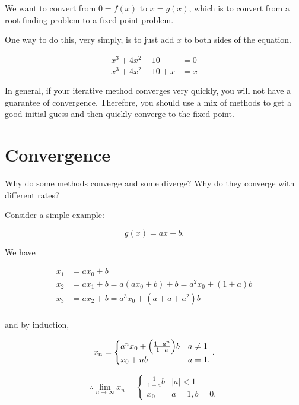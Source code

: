 We want to convert from $0 = f(x)$ to $x=g(x)$, which is to convert from a root
finding problem to a fixed point problem.

One way to do this, very simply, is to just add $x$ to both sides of the
equation.

\begin{align*}
  x^3 + 4x^2 -10 &= 0 \\
  x^3 + 4x^2 -10 + x &= x
\end{align*}

In general, if your iterative method converges very quickly, you will not have
a guarantee of convergence. Therefore, you should use a mix of methods to
get a good initial guess and then quickly converge to the fixed point.

\section{Convergence}

Why do some methods converge and some diverge? Why do they converge with
different rates?

Consider a simple example:

\ex

\[
g(x) = ax+b
.\]

We have

\begin{align*}
  x_1 &=  ax_0 + b \\
  x_2 &=  ax_1 + b = a(ax_0 + b) + b = a^2x_0 + (1+a)b \\
  x_3 &=  ax_2 + b = a^3x_0 + (a+a+a^2)b \\
\end{align*}

and by induction,

\begin{equation*}
  x_n = \begin{cases}
    a^nx_0 + \pqty{\frac{1-a^n}{1-a}} b & a \ne 1 \\
    x_0 + nb & a = 1
  .\end{cases}
.\end{equation*}

\begin{equation*}
  \therefore \lim_{n \to \infty} x_n = \begin{cases}
    \frac{1}{1-a}b & |a| < 1 \\
    x_0 &  a = 1, b = 0
  .\end{cases}
\end{equation*}

